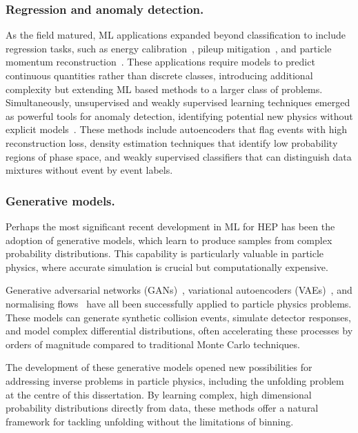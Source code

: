 \subsubsection{Regression and anomaly detection.}
        \label{subsubsec:regression-and-anomaly-detection}
As the field matured, ML applications expanded beyond classification to include regression tasks, such as energy calibration~\cite{Holmberg2023JetPipeline}, pileup mitigation~\cite{Komiske2018PileupPUMML}, and particle momentum reconstruction~\cite{Haake2019Machine-learning-basedCollisions}.
%
These applications require models to predict continuous quantities rather than discrete classes, introducing additional complexity but extending ML based methods to a larger class of problems.
%
Simultaneously, unsupervised and weakly supervised learning techniques emerged as powerful tools for anomaly detection, identifying potential new physics without explicit models~\cite{Belis2024MachinePhysics}.
%
These methods include autoencoders that flag events with high reconstruction loss, density estimation techniques that identify low probability regions of phase space, and weakly supervised classifiers that can distinguish data mixtures without event by event labels.

\subsubsection{Generative models.}
Perhaps the most significant recent development in ML for HEP has been the adoption of generative models, which learn to produce samples from complex probability distributions.
%
This capability is particularly valuable in particle physics, where accurate simulation is crucial but computationally expensive.

Generative adversarial networks (GANs)~\cite{Goodfellow2014GenerativeNetworks}, variational autoencoders (VAEs)~\cite{Kingma2019AnAutoencoders}, and normalising flows~\cite{Kobyzev2019NormalizingMethods} have all been successfully applied to particle physics problems.
%
These models can generate synthetic collision events\cite{Moodie2022OptimisingNetworks}, simulate detector responses\cite{Darulis2022MachineSimulations, Xu2023GenerativeFlow}, and model complex differential distributions,\cite{Butter2025GenerativeMapping} often accelerating these processes by orders of magnitude compared to traditional Monte Carlo techniques.

The development of these generative models opened new possibilities for addressing inverse problems in particle physics, including the unfolding problem at the centre of this dissertation.
%
By learning complex, high dimensional probability distributions directly from data, these methods offer a natural framework for tackling unfolding without the limitations of binning.

